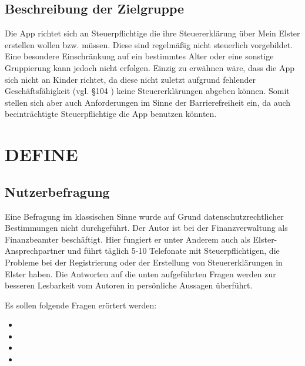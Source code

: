 \subsection{Beschreibung der Zielgruppe}\label{Beschreibung der Zielgruppe}
Die App richtet sich an Steuerpflichtige die ihre Steuererklärung über \grq{}Mein Elster\grq{} erstellen wollen bzw. müssen.
Diese sind regelmäßig nicht steuerlich vorgebildet. Eine besondere Einschränkung auf ein bestimmtes Alter oder eine sonstige Gruppierung kann jedoch nicht erfolgen. Einzig zu erwähnen wäre, dass die App sich nicht an Kinder richtet, da diese nicht zuletzt aufgrund fehlender Geschäftsfähigkeit (vgl. §104 \cite{bgb}) keine Steuererklärungen abgeben können. Somit stellen sich aber auch Anforderungen im Sinne der Barrierefreiheit ein, da auch beeinträchtigte Steuerpflichtige die App benutzen könnten.


\section{DEFINE}\label{DEFINE}


\subsection{Nutzerbefragung}%

Eine Befragung im klassischen Sinne wurde auf Grund datenschutzrechtlicher Bestimmungen nicht durchgeführt. Der Autor ist bei der Finanzverwaltung als Finanzbeamter beschäftigt. Hier fungiert er unter Anderem auch als Elster-Ansprechpartner und führt täglich 5-10 Telefonate mit Steuerpflichtigen, die Probleme bei der Registrierung oder der Erstellung von Steuererklärungen in Elster haben. Die Antworten auf die unten aufgeführten Fragen werden zur besseren Lesbarkeit vom Autoren in persönliche Aussagen überführt.

Es sollen folgende Fragen erörtert werden:
\begin{itemize}
\item {}

\item {}

\item {}

\item {}

\end{itemize}



